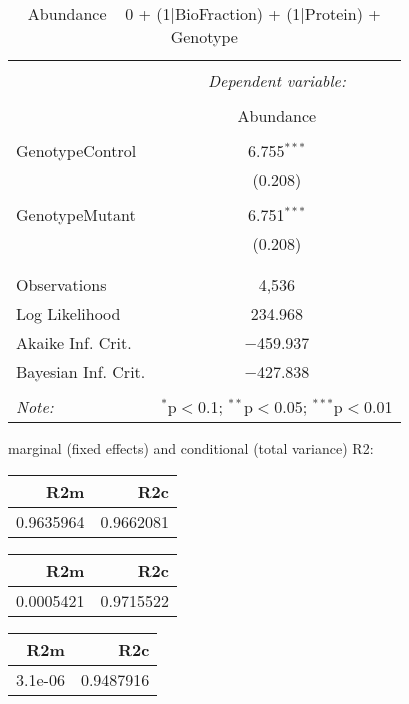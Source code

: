 \documentclass[11pt]{report}
\begin{document}
\begin{table}[!htbp] \centering 
  \caption{Abundance ~ 0 + (1|BioFraction) + (1|Protein) + Genotype} 
  \label{} 
\begin{tabular}{@{\extracolsep{5pt}}lc} 
\\[-1.8ex]\hline 
\hline \\[-1.8ex] 
 & \multicolumn{1}{c}{\textit{Dependent variable:}} \\ 
\cline{2-2} 
\\[-1.8ex] & Abundance \\ 
\hline \\[-1.8ex] 
 GenotypeControl & 6.755$^{***}$ \\ 
  & (0.208) \\ 
  & \\ 
 GenotypeMutant & 6.751$^{***}$ \\ 
  & (0.208) \\ 
  & \\ 
\hline \\[-1.8ex] 
Observations & 4,536 \\ 
Log Likelihood & 234.968 \\ 
Akaike Inf. Crit. & $-$459.937 \\ 
Bayesian Inf. Crit. & $-$427.838 \\ 
\hline 
\hline \\[-1.8ex] 
\textit{Note:}  & \multicolumn{1}{r}{$^{*}$p$<$0.1; $^{**}$p$<$0.05; $^{***}$p$<$0.01} \\ 
\end{tabular} 
\end{table} 
marginal (fixed effects) and conditional (total variance) R2:

\begin{tabular}{r|r}
\hline
R2m & R2c\\
\hline
0.9635964 & 0.9662081\\
\hline
\end{tabular}

\begin{tabular}{r|r}
\hline
R2m & R2c\\
\hline
0.0005421 & 0.9715522\\
\hline
\end{tabular}

\begin{tabular}{r|r}
\hline
R2m & R2c\\
\hline
3.1e-06 & 0.9487916\\
\hline
\end{tabular}
\end{document}

